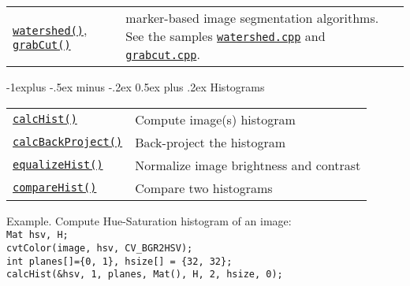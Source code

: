 \documentclass[10pt,landscape]{article}
\makeatletter
\renewcommand{\subsection}{\@startsection{subsection}{2}{0mm}%
                                {-1explus -.5ex minus -.2ex}%
                                {0.5ex plus .2ex}%
                                {\normalfont\normalsize\bfseries}}
\makeatother
\begin{document}
\begin{multicols}{3}
\begin{tabular}{@{}p{\the\MyLen}%
                @{}p{\linewidth-\the\MyLen}@{}}
\texttt{\href{http://opencv.willowgarage.com/documentation/cpp/imgproc_miscellaneous_image_transformations.html\#floodfill}{watershed()}},
\texttt{\href{http://opencv.willowgarage.com/documentation/cpp/imgproc_miscellaneous_image_transformations.html\#grabcut}{grabCut()}}
 & marker-based image segmentation algorithms.
 See the samples \texttt{\href{https://code.ros.org/svn/opencv/trunk/opencv/samples/cpp/watershed.cpp}{watershed.cpp}} and \texttt{\href{https://code.ros.org/svn/opencv/trunk/opencv/samples/cpp/grabcut.cpp}{grabcut.cpp}}.

\end{tabular}

\subsection{Histograms}

\begin{tabular}{@{}p{\the\MyLen}%
                @{}p{\linewidth-\the\MyLen}@{}}

\texttt{\href{http://opencv.willowgarage.com/documentation/cpp/imgproc_histograms.html\#calchist}{calcHist()}} & Compute image(s) histogram \\

\texttt{\href{http://opencv.willowgarage.com/documentation/cpp/imgproc_histograms.html\#calcbackproject}{calcBackProject()}} & Back-project the histogram \\

\texttt{\href{http://opencv.willowgarage.com/documentation/cpp/imgproc_histograms.html\#equalizehist}{equalizeHist()}} & Normalize image brightness and contrast\\

\texttt{\href{http://opencv.willowgarage.com/documentation/cpp/imgproc_histograms.html\#comparehist}{compareHist()}} & Compare two histograms\\

\end{tabular}

\begin{tabbing}
Example. Compute Hue-Saturation histogram of an image:\\
\texttt{Mat hsv, H;}\\
\texttt{cvtColor(image, hsv, CV\_BGR2HSV);}\\
\texttt{int planes[]=\{0, 1\}, hsize[] = \{32, 32\};}\\
\texttt{calcHist(\&hsv, 1, planes, Mat(), H, 2, hsize, 0);}\\
\end{tabbing}


\end{multicols}
\end{document}

